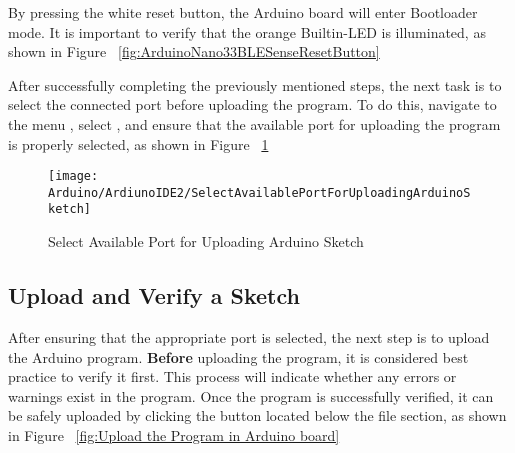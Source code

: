 By pressing the white reset button, the Arduino board will enter Bootloader mode. It is important to verify that the orange Builtin-LED is illuminated, as shown in Figure ~\ref{fig:ArduinoNano33BLESenseResetButton}			



\begin{center}
		\label{fig:ArduinoNano33BLESenseResetButton}	
\end{center}	



 
 

After successfully completing the previously mentioned steps, the next task is to select the connected port before uploading the program. To do this, navigate to the menu , select , and ensure that the available port for uploading the program is properly selected, as shown in Figure ~\ref{fig:SelectAvailablePortforUploadingArduinoSketch}	



\begin{figure}[H]\centering
	\texttt{[image: Arduino/ArdiunoIDE2/SelectAvailablePortForUploadingArduinoSketch]}
	\caption{Select Available Port for Uploading Arduino Sketch}
	\label{fig:SelectAvailablePortforUploadingArduinoSketch}		
\end{figure}




\subsection{Upload and Verify a Sketch}\label{uploadcode}

After ensuring that the appropriate port is selected, the next step is to upload the Arduino program. \textbf{Before} uploading the program, it is considered best practice to verify it first. This process will indicate whether any errors or warnings exist in the program. Once the program is successfully verified, it can be safely uploaded by clicking the button  located below the file section, as shown in Figure ~\ref{fig:Upload the Program in Arduino board}




